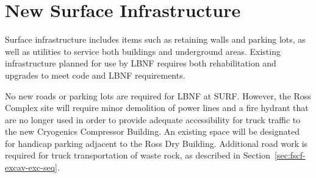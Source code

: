 \section{New Surface Infrastructure}
\label{sec:fscf-surf-facil-surface-new}

Surface infrastructure includes items such as retaining walls and parking lots, as well as utilities to service both buildings and underground areas.  Existing infrastructure planned for use by LBNF requires both rehabilitation and upgrades to meet code and LBNF requirements. 

No new roads or parking lots are required for LBNF at SURF. However, the Ross Complex site will require minor demolition of power lines and a fire hydrant that are no longer used in order to provide adequate accessibility for truck traffic to the new Cryogenics Compressor Building. An existing space will be designated for handicap parking adjacent to the Ross Dry Building. Additional road work is required for truck transportation of waste rock, as described in Section~\ref{sec:fscf-excav-exc-seq}.




